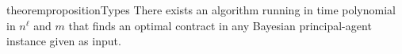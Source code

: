 \begin{restatable}{theorem}{propositionTypes}\label{prop:types}
	There exists an algorithm running in time polynomial in $n^\ell$ and $m$ that finds an optimal contract in any Bayesian principal-agent instance given as input.
\end{restatable}




